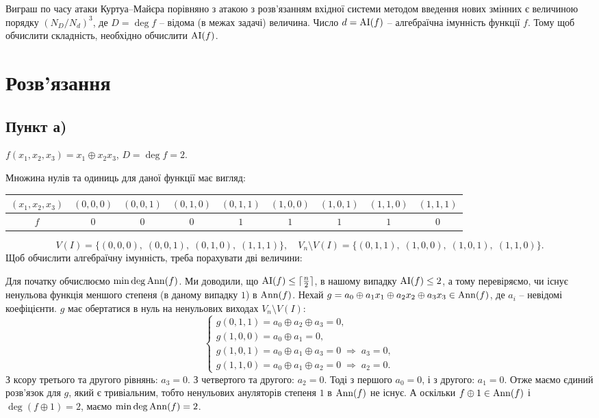 Виграш по часу атаки Куртуа--Майєра порівняно з атакою з розв'язанням вхідної системи методом введення нових змінних 
є величиною порядку $(N_{D} / N_{d})^3$, де $D = \deg f$ -- відома (в межах задачі) величина. Число 
$d = \operatorname{AI}(f)$ -- алгебраїчна імунність функції $f$. Тому щоб обчислити складність, необхідно обчислити $\operatorname{AI}(f)$.

\section{Розв'язання}

\subsection*{Пункт а)}
$f(x_1, x_2, x_3) = x_1 \oplus x_2 x_3$, $D = \deg f = 2$.

\noindent Множина нулів та одиниць для даної функції має вигляд:
\begin{center}
    \begin{tabular}{c|cccccccc}
        $(x_1, x_2, x_3)$ & $(0,0,0)$ & $(0,0,1)$ & $(0,1,0)$ & $(0,1,1)$
                          & $(1,0,0)$ & $(1,0,1)$ & $(1,1,0)$ & $(1,1,1)$                         \\
        \hline
        $f$               & $0$       & $0$       & $0$       & $1$       & $1$ & $1$ & $1$ & $0$
    \end{tabular}
\end{center}
\begin{equation*}
    V (I) = \{(0,0,0),\; (0,0,1),\; (0,1,0),\; (1,1,1)\}, \quad
    V_{n} \setminus V(I) = \{(0,1,1),\; (1,0,0),\; (1,0,1),\; (1,1,0)\}.
\end{equation*}
Щоб обчислити алгебраїчну імунність, треба порахувати дві величини:

Для початку обчислюємо $\min \deg \operatorname{Ann}(f)$. Ми доводили, що $\operatorname{AI} (f) \leq \lceil \frac{n}{2}\rceil$, в нашому випадку 
$\operatorname{AI} (f) \leq 2$, а тому перевіряємо, чи існує ненульова функція меншого степеня (в даному випадку $1$) в $\operatorname{Ann}(f)$. 
Нехай $g = a_0 \oplus a_1 x_1 \oplus a_2 x_2 \oplus a_3 x_3 \in \operatorname{Ann}(f)$, де $a_{i}$ -- невідомі коефіцієнти. $g$ 
має обертатися в нуль на ненульових виходах $V_{n} \setminus V(I)$:
\begin{equation*}
    \begin{cases}
        g(0,1,1) = a_0 \oplus a_2 \oplus a_3 = 0, \\
        g(1,0,0) = a_0 \oplus a_1 = 0, \\
        g(1,0,1) = a_0 \oplus a_1 \oplus a_3 = 0 \;\Rightarrow\; a_3 = 0, \\
        g(1,1,0) = a_0 \oplus a_1 \oplus a_2 = 0 \;\Rightarrow\; a_2 = 0.
    \end{cases}
\end{equation*}
З ксору третього та другого рівнянь: $a_{3} = 0$. З четвертого та другого: $a_{2} = 0$. Тоді з першого $a_0 = 0$, 
і з другого: $a_1 = 0$. Отже маємо єдиний розв'язок для $g$, який є тривіальним, тобто ненульових ануляторів степеня 
$1$ в $\operatorname{Ann}(f)$ не існує. А оскільки $f \oplus 1 \in \operatorname{Ann}(f)$ і $\deg(f \oplus 1) = 2$, маємо $\min \deg \operatorname{Ann}(f) = 2$.

